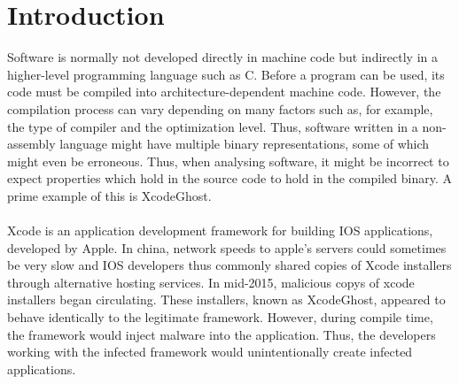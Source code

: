\documentclass{kththesis}
\begin{document}
\listoffigures
\thispagestyle{empty}
 
\listoftables
\thispagestyle{empty}

\mainmatter
\cleardoublepage
{}


\chapter{Introduction}
%
Software is normally not developed directly in machine code but indirectly in a higher-level programming language such as C. Before a program can be used, its code must be compiled into architecture-dependent machine code. However, the compilation process can vary depending on many factors such as, for example, the type of compiler and the optimization level. Thus, software written in a non-assembly language might have multiple binary representations, some of which might even be erroneous\cite{preciseCFG}. Thus, when analysing software, it might be incorrect to expect properties which hold in the source code to hold in the compiled binary. A prime example of this is XcodeGhost.
\\ \\
Xcode is an application development framework for building IOS applications, developed by Apple\cite{Xcode}. In china, network speeds to apple's servers could sometimes be very slow and IOS developers thus commonly shared copies of Xcode installers through alternative hosting services\cite{XcodeGhost}. In mid-2015, malicious copys of xcode installers began circulating. These installers, known as XcodeGhost\cite{XcodeGhost}, appeared to behave identically to the legitimate framework. However, during compile time, the framework would inject malware into the application. Thus, the developers working with the infected framework would unintentionally create infected applications. 
\end{document}

